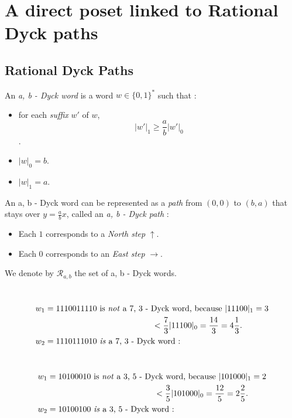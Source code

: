\section{A direct poset linked to Rational Dyck paths}

\subsection{Rational Dyck Paths}

\begin{definition}
    An \emph{a, b - Dyck word} is a word $w \in \{0,1\}^*$
    such that :
    \begin{itemize}
        \item for each \emph{suffix} $w'$ of $w$,
            $$|w'|_1 \geqslant \frac{a}{b}|w'|_0$$.
        \item $|w|_0 = b$.
        \item $|w|_1 = a$.
    \end{itemize}
    An a, b - Dyck word can be represented as a 
    \emph{path} from $(0,0)$ to $(b,a)$ that stays over
    $y = \frac{a}{b}x$, called an \emph{a, b - Dyck path} :
    \begin{itemize}
        \item Each $1$ corresponds to a \emph{North step}
        $\uparrow$. 
        \item Each $0$ corresponds to an \emph{East step}
        $\rightarrow$.
    \end{itemize}
    We denote by $\mathcal{R}_{a, b}$ the set of
    a, b - Dyck words.
\end{definition}

\begin{example}[$a > b : a = 7, b = 3$]
    ~\\
    \begin{align*}
        &w_1 = 1110011110 \text{ is \emph{not} a 7, 3 - Dyck
        word, because } |11100|_1 = 3\\
        & \hspace{5cm} < \frac{7}{3}|11100|_0
        = \frac{14}{3} = 4 \frac{1}{3}.\\
        &w_2 = 1110111010 \text{ \emph{is} a 7, 3 - Dyck 
        word : }\\
    \end{align*}
    
\end{example}

\begin{example}[$a < b : a = 3, b = 5$]
    ~\\
    \begin{align*}
        &w_1 = 10100010 \text{ is \emph{not} a 3, 5 - Dyck
        word, because } |101000|_1 = 2\\
        & \hspace{5cm} < \frac{3}{5}|101000|_0
        = \frac{12}{5} = 2 \frac{2}{5}.\\
        &w_2 = 10100100 \text{ \emph{is} a 3, 5 - Dyck 
        word : }\\
    \end{align*}
    
\end{example}

